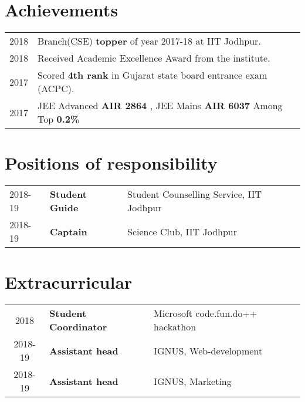 \documentclass[a4paper]{deedy-resume-openfont}
\begin{document}
\begin{minipage}[t]{0.63\textwidth}

\section{Achievements}
\begin{tabular}{l p{}}
2018 & Branch(CSE) \textbf{topper} of year 2017-18 at IIT Jodhpur. \\
2018 & Received Academic Excellence Award from the institute. \\
2017 & Scored \textbf{4th rank} in Gujarat state board entrance exam (ACPC). \\
2017 & JEE Advanced \textbf{AIR 2864} , JEE Mains \textbf{AIR 6037} Among Top \textbf{0.2\%} \\
\end{tabular}
\sectionsep


\section{Positions of responsibility}
\begin{tabular}{ l l l }
2018-19 & \textbf{Student Guide} & Student Counselling Service, IIT Jodhpur \\
2018-19 & \textbf{Captain} & Science Club, IIT Jodhpur \\  
\end{tabular}

\section{Extracurricular}
\begin{tabular}{ c l l }
   2018  & \textbf{Student Coordinator} & Microsoft code.fun.do++ hackathon\\
 2018-19 & \textbf{Assistant head} & IGNUS, Web-development \\
 2018-19 & \textbf{Assistant head} & IGNUS, Marketing
 \end{tabular}
 
\end{minipage} 
\end{document}
